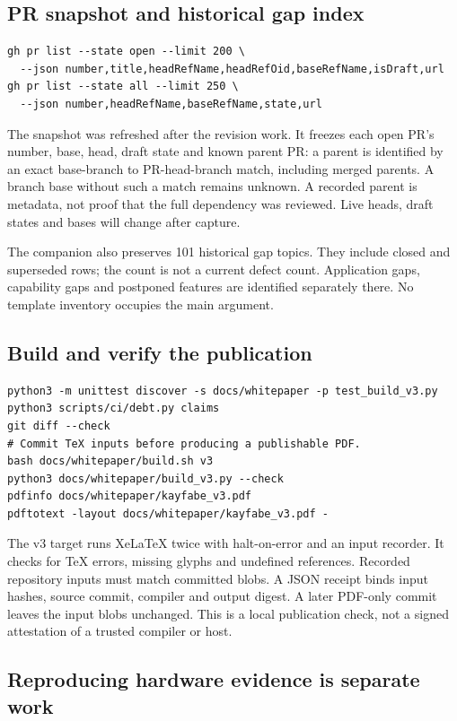 \subsection{PR snapshot and historical gap index}

\begin{verbatim}
gh pr list --state open --limit 200 \
  --json number,title,headRefName,headRefOid,baseRefName,isDraft,url
gh pr list --state all --limit 250 \
  --json number,headRefName,baseRefName,state,url
\end{verbatim}

The snapshot was refreshed after the revision work. It freezes each open PR's number, base,
head, draft state and known parent PR: a parent is identified by an exact base-branch to
PR-head-branch match, including merged parents. A branch base without such a match remains
unknown. A recorded parent is metadata, not proof that the full dependency was reviewed.
Live heads, draft states and bases will change after capture.

The companion also preserves 101 historical gap topics. They include closed and superseded
rows; the count is not a current defect count. Application gaps, capability gaps and postponed
features are identified separately there. No template inventory occupies the main argument.

\subsection{Build and verify the publication}

\begin{verbatim}
python3 -m unittest discover -s docs/whitepaper -p test_build_v3.py
python3 scripts/ci/debt.py claims
git diff --check
# Commit TeX inputs before producing a publishable PDF.
bash docs/whitepaper/build.sh v3
python3 docs/whitepaper/build_v3.py --check
pdfinfo docs/whitepaper/kayfabe_v3.pdf
pdftotext -layout docs/whitepaper/kayfabe_v3.pdf -
\end{verbatim}

\readcode The v3 target runs XeLaTeX twice with halt-on-error and an input recorder. It checks
for TeX errors, missing glyphs and undefined references. Recorded repository inputs must match
committed blobs. A JSON receipt binds input hashes, source commit, compiler and output digest.
A later PDF-only commit leaves the input blobs unchanged. This is a local publication check,
not a signed attestation of a trusted compiler or host.

\subsection{Reproducing hardware evidence is separate work}

